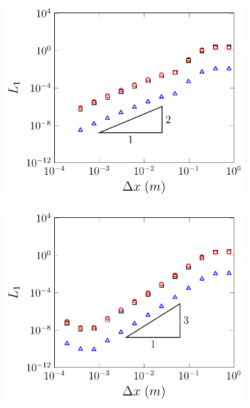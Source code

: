 \begin{figure}
	\begin{subfigure}{0.5\textwidth}
		\includegraphics[width=\textwidth]{./chp5/figures/Analytic/Soliton/L1/FEVM2.pdf}
		\vspace{0.5cm}
	\end{subfigure}%
	\begin{subfigure}{0.5\textwidth}
		\includegraphics[width=\textwidth]{./chp5/figures/Analytic/Soliton/L1/FDVM3.pdf}
		\vspace{0.5cm}
	\end{subfigure}
	\begin{subfigure}{0.5\textwidth}

\end{subfigure}
\end{figure}
